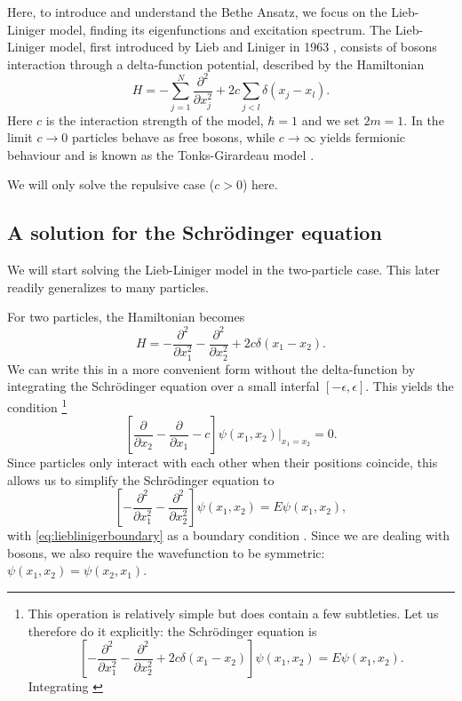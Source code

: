 \documentclass[11pt, a4paper,draft]{report} %
\begin{document}
Here, to introduce and understand the Bethe Ansatz, we focus on the Lieb-Liniger model, finding its eigenfunctions and excitation spectrum.
The Lieb-Liniger model, first introduced by Lieb and Liniger in 1963 \cite{Lieb1963, Lieb1963a}, consists of bosons interaction through a delta-function potential, described by the Hamiltonian
\begin{equation}
	H = - \sum_{j=1}^{N} \frac{\partial^2}{\partial x_j^2} + 2c \sum_{j<l} \delta(x_j - x_l).
\end{equation}
Here \(c\) is the interaction strength of the model, \(\hbar=1\) and we set \(2m=1\).
In the limit \(c\to0\) particles behave as free bosons, while \(c\to\infty\) yields fermionic behaviour and is known as the Tonks-Girardeau model \cite{Lieb1963, Franchini2017}.

We will only solve the repulsive case (\(c > 0\)) here. 

\subsection{A solution for the Schrödinger equation}

We will start solving the Lieb-Liniger model in the two-particle case. This later readily generalizes to many particles.

For two particles, the Hamiltonian becomes
\begin{equation}
	H =  - \frac{\partial^2}{\partial x_1^2} - \frac{\partial^2}{\partial x_2^2} + 2c \delta(x_1 - x_2).
\end{equation}
We can write this in a more convenient form without the delta-function by integrating the Schrödinger equation over a small interfal \([-\epsilon,\epsilon]\).
This yields the condition \cite{Lieb1963}\footnote{This operation is relatively simple but does contain a few subtleties. Let us therefore do it explicitly:
the Schrödinger equation is
\begin{equation}
	\left[- \frac{\partial^2}{\partial x_1^2} - \frac{\partial^2}{\partial x_2^2} + 2c \delta(x_1 - x_2)\right] \psi(x_1, x_2) = E \psi(x_1,x_2).
\end{equation} 
Integrating \cite{Griffiths1993}
}
\begin{equation}\label{eq:lieblinigerboundary}
	\left[\frac{\partial}{\partial x_2} - \frac{\partial}{\partial x_1} - c\right] \psi(x_1, x_2)\bigg\rvert_{x_1 = x_2} = 0.
\end{equation}
Since particles only interact with each other when their positions coincide, this allows us to simplify the Schrödinger equation to
\begin{equation}\label{eq:lieblinigersimple}
	\left[- \frac{\partial^2}{\partial x_1^2} - \frac{\partial^2}{\partial x_2^2}\right] \psi(x_1, x_2) = E \psi(x_1,x_2),
\end{equation}
with \cref{eq:lieblinigerboundary} as a boundary condition \cite{Lieb1963}.
Since we are dealing with bosons, we also require the wavefunction to be symmetric: \(\psi(x_1,x_2) = \psi(x_2,x_1)\).
\end{document}
